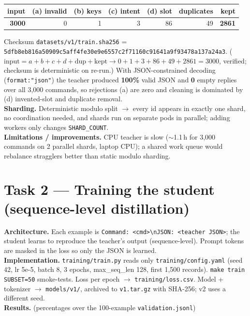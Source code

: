 \documentclass[10pt,a4paper]{article}
\newcommand{\code}[1]{\texttt{\small #1}}
\begin{document}
\begin{center}\small
\begin{tabular}{rrrrrrr}
\toprule
input & (a) invalid & (b) keys & (c) intent & (d) slot & duplicates & kept \\
\midrule
\textbf{3000} & 0 & 1 & 3 & 86 & 49 & \textbf{2861} \\
\bottomrule
\end{tabular}
\end{center}

\noindent Checksum \code{datasets/v1/train.sha256} = \code{5dfb8eb816a50909c5aff4fe30e9e6557c2f711\allowbreak60c91641a9f93478a137a24a3}.
($\text{input} = a+b+c+d+\text{dup}+\text{kept} \rightarrow 0+1+3+86+49+2861 = 3000$, verified; checksum is
deterministic on re-run.) With JSON-constrained decoding (\code{format:"json"}) the teacher produced
\textbf{100\%} valid JSON and \textbf{0} empty replies over all 3{,}000 commands, so rejections (a) are zero
and cleaning is dominated by (d) invented-slot and duplicate removal.\\
\textbf{Sharding.} Deterministic modulo split $\rightarrow$ every id appears in exactly one shard, no
coordination needed, and shards run on separate pods in parallel; adding workers only changes
\code{SHARD\_COUNT}.\\
\textbf{Limitations / improvements.} CPU teacher is slow ($\sim$1.1\,h for 3{,}000 commands on 2 parallel
shards, laptop CPU); a shared work queue would rebalance stragglers better than static modulo sharding.

\section{Task 2 --- Training the student (sequence-level distillation)}
\textbf{Architecture.} Each example is \code{Command: <cmd>\textbackslash nJSON: <teacher JSON>}; the student
learns to reproduce the teacher's output (sequence-level). Prompt tokens are masked in the loss so only the
JSON is learned.\\
\textbf{Implementation.} \code{training/train.py} reads only \code{training/config.yaml} (seed 42, lr
5e-5, batch 8, 3 epochs, max\_seq\_len 128, first 1{,}500 records). \code{make train SUBSET=50} smoke-tests.
Loss per epoch $\rightarrow$ \code{training/loss.csv}. Model + tokenizer $\rightarrow$ \code{models/v1/},
archived to \code{v1.tar.gz} with SHA-256; v2 uses a different seed.\\
\textbf{Results.} (percentages over the 100-example \code{validation.jsonl})
\end{document}

